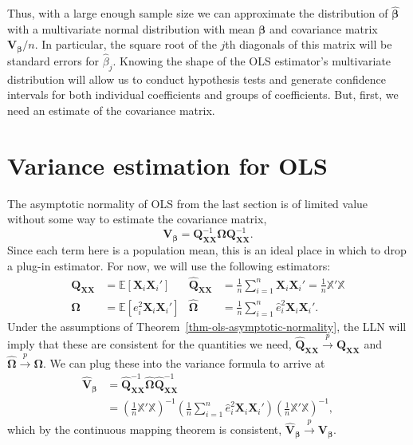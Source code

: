 \documentclass[
  13pt,
  letterpaper,
  DIV=11,
  numbers=noendperiod]{scrreprt}
\newcommand{\mb}{\symbf}
\newcommand{\E}{\mathbb{E}}
\newcommand{\X}{\mb{X}}
\newcommand{\Xmat}{\mathbb{X}}
\newcommand{\bfbeta}{\mb{\beta}}
\newcommand{\bhat}{\widehat{\mb{\beta}}}
\newcommand{\inprob}{\overset{p}{\to}}
\theoremstyle{definition}
\theoremstyle{definition}
\theoremstyle{plain}
\theoremstyle{remark}
\begin{document}
Thus, with a large enough sample size we can approximate the
distribution of \(\bhat\) with a multivariate normal distribution with
mean \(\bfbeta\) and covariance matrix \(\mb{V}_{\bfbeta}/n\). In
particular, the square root of the \(j\)th diagonals of this matrix will
be standard errors for \(\widehat{\beta}_j\). Knowing the shape of the
OLS estimator's multivariate distribution will allow us to conduct
hypothesis tests and generate confidence intervals for both individual
coefficients and groups of coefficients. But, first, we need an estimate
of the covariance matrix.

\section{Variance estimation for OLS}\label{variance-estimation-for-ols}

The asymptotic normality of OLS from the last section is of limited
value without some way to estimate the covariance matrix, \[ 
\mb{V}_{\bfbeta} = \mb{Q}_{\X\X}^{-1}\mb{\Omega}\mb{Q}_{\X\X}^{-1}.
\] Since each term here is a population mean, this is an ideal place in
which to drop a plug-in estimator. For now, we will use the following
estimators: \[ 
\begin{aligned}
  \mb{Q}_{\X\X} &= \E[\X_{i}\X_{i}'] & \widehat{\mb{Q}}_{\X\X} &= \frac{1}{n} \sum_{i=1}^{n} \X_{i}\X_{i}' = \frac{1}{n}\Xmat'\Xmat \\
  \mb{\Omega} &= \E[e_i^2\X_i\X_i'] & \widehat{\mb{\Omega}} & = \frac{1}{n}\sum_{i=1}^n\widehat{e}_i^2\X_i\X_i'.
\end{aligned}
\] Under the assumptions of Theorem~\ref{thm-ols-asymptotic-normality},
the LLN will imply that these are consistent for the quantities we need,
\(\widehat{\mb{Q}}_{\X\X} \inprob \mb{Q}_{\X\X}\) and
\(\widehat{\mb{\Omega}} \inprob \mb{\Omega}\). We can plug these into
the variance formula to arrive at \[ 
\begin{aligned}
  \widehat{\mb{V}}_{\bfbeta} &= \widehat{\mb{Q}}_{\X\X}^{-1}\widehat{\mb{\Omega}}\widehat{\mb{Q}}_{\X\X}^{-1} \\
  &= \left( \frac{1}{n} \Xmat'\Xmat \right)^{-1} \left( \frac{1}{n} \sum_{i=1}^n\widehat{e}_i^2\X_i\X_i' \right) \left( \frac{1}{n} \Xmat'\Xmat \right)^{-1},
\end{aligned}
\] which by the continuous mapping theorem is consistent,
\(\widehat{\mb{V}}_{\bfbeta} \inprob \mb{V}_{\bfbeta}\).
\end{document}
